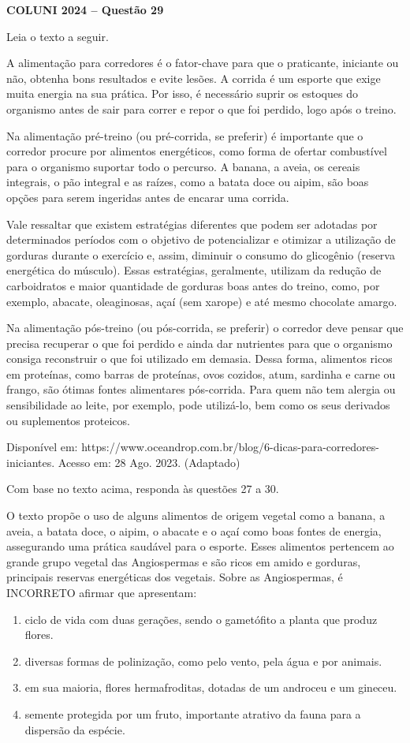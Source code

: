 \textbf{COLUNI 2024 -- Questão 29}\par\medskip Leia o texto a seguir.

A alimentação para corredores é o fator-chave para que o praticante, iniciante ou não, obtenha bons resultados e evite lesões. A corrida é um esporte que exige muita energia na sua prática. Por isso, é necessário suprir os estoques do organismo antes de sair para correr e repor o que foi perdido, logo após o treino.

Na alimentação pré-treino (ou pré-corrida, se preferir) é importante que o corredor procure por alimentos energéticos, como forma de ofertar combustível para o organismo suportar todo o percurso. A banana, a aveia, os cereais integrais, o pão integral e as raízes, como a batata doce ou aipim, são boas opções para serem ingeridas antes de encarar uma corrida.

Vale ressaltar que existem estratégias diferentes que podem ser adotadas por determinados períodos com o objetivo de potencializar e otimizar a utilização de gorduras durante o exercício e, assim, diminuir o consumo do glicogênio (reserva energética do músculo). Essas estratégias, geralmente, utilizam da redução de carboidratos e maior quantidade de gorduras boas antes do treino, como, por exemplo, abacate, oleaginosas, açaí (sem xarope) e até mesmo chocolate amargo.

Na alimentação pós-treino (ou pós-corrida, se preferir) o corredor deve pensar que precisa recuperar o que foi perdido e ainda dar nutrientes para que o organismo consiga reconstruir o que foi utilizado em demasia. Dessa forma, alimentos ricos em proteínas, como barras de proteínas, ovos cozidos, atum, sardinha e carne ou frango, são ótimas fontes alimentares pós-corrida. Para quem não tem alergia ou sensibilidade ao leite, por exemplo, pode utilizá-lo, bem como os seus derivados ou suplementos proteicos.

Disponível em: https://www.oceandrop.com.br/blog/6-dicas-para-corredores-iniciantes. Acesso em: 28 Ago. 2023. (Adaptado)

Com base no texto acima, responda às questões 27 a 30.

O texto propõe o uso de alguns alimentos de origem vegetal como a banana, a aveia, a batata doce, o aipim, o abacate e o açaí como boas fontes de energia, assegurando uma prática saudável para o esporte. Esses alimentos pertencem ao grande grupo vegetal das Angiospermas e são ricos em amido e gorduras, principais reservas energéticas dos vegetais. Sobre as Angiospermas, é INCORRETO afirmar que apresentam:\begin{enumerate}
\item ciclo de vida com duas gerações, sendo o gametófito a planta que produz flores.
\item diversas formas de polinização, como pelo vento, pela água e por animais.
\item em sua maioria, flores hermafroditas, dotadas de um androceu e um gineceu.
\item semente protegida por um fruto, importante atrativo da fauna para a dispersão da espécie.\end{enumerate}
